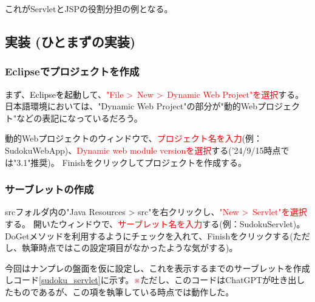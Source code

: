 \documentclass[a4paper,10pt]{jsarticle}
\begin{document}
    これがServletとJSPの役割分担の例となる。

  \subsection{実装 (ひとまずの実装)}
    \subsubsection{Eclipseでプロジェクトを作成}
      まず、\textcolor{black}{Eclipseを起動}して、\textcolor{red}{"File \textgreater \ New \textgreater \ Dynamic Web Project"を選択}する。
      日本語環境においては、"Dynamic Web Project"の部分が"動的Webプロジェクト"などの表記になっているだろう。

      動的Webプロジェクトのウィンドウで、\textcolor{red}{プロジェクト名を入力}(例：SudokuWebApp)、\textcolor{red}{Dynamic web module versionを選択}する('24/9/15時点では"3.1"推奨)。
      Finishをクリックしてプロジェクトを作成する。
    \subsubsection{サーブレットの作成}
      srcフォルダ内の"Java Resources > src"を右クリックし、\textcolor{red}{"New \textgreater \ Servlet"を選択}する。
      開いたウィンドウで、\textcolor{red}{サーブレット名を入力}する(例：SudokuServlet)。
      DoGetメソッドを利用するようにチェックを入れて、Finishをクリックする(ただし、執筆時点ではこの設定項目がなかったような気がする)。

      今回はナンプレの盤面を仮に設定し、これを表示するまでのサーブレットを作成しコード\ref{sudoku_servlet}に示す。\textcolor{red}{※}ただし、このコードはChatGPTが吐き出したものであるが、この項を執筆している時点では動作した。\\
\end{document}
